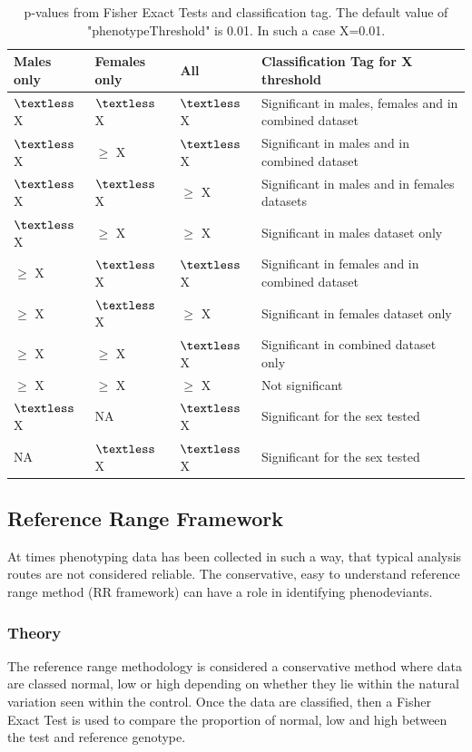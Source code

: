 \documentclass[12pt,a4paper]{article}
\begin{document}
\begin{table}[!h]
\begin{center}
\begin{tabular}{| l | l | l | p{8cm} |}
  \hline
Males only&Females only&All&Classification Tag for X threshold\\\hline
$\textless$ X&$\textless$ X &$\textless$ X&Significant in males, females and in combined dataset\\
$\textless$ X&$\geq$ X&$\textless$ X&Significant in males and in combined dataset\\
$\textless$ X&$\textless$ X&$\geq$ X&Significant in males and in females datasets\\
$\textless$ X&$\geq$ X&$\geq$ X&Significant in males dataset only\\
$\geq$ X&$\textless$ X&$\textless$ X&Significant in females and in combined dataset\\
$\geq$ X&$\textless$ X&$\geq$ X&Significant in females dataset only\\
$\geq$ X&$\geq$ X&$\textless$ X&Significant in combined dataset only\\
$\geq$ X&$\geq$ X&$\geq$ X&Not significant\\
$\textless$ X&NA&$\textless$ X&Significant for the sex tested\\
NA&$\textless$ X&$\textless$ X&Significant for the sex tested\\

\hline  
\end{tabular}
\caption{p-values from Fisher Exact Tests and classification tag. The default value of "phenotypeThreshold" is 0.01. In such a case X=0.01.}\label{table:06}
\end{center}
\end{table}

\subsection{Reference Range Framework}
At times phenotyping data has been collected in such a way, that typical analysis routes are not considered reliable. The conservative, easy to understand reference range method (RR framework) can have a role in identifying phenodeviants.   
\subsubsection{Theory}
The reference range methodology is considered a conservative method where data are classed normal, low or high depending on whether they lie within the natural variation seen within the control. Once the data are classified, then a Fisher Exact Test is used to compare the proportion of normal, low and high between the test and reference genotype. 
\end{document}
